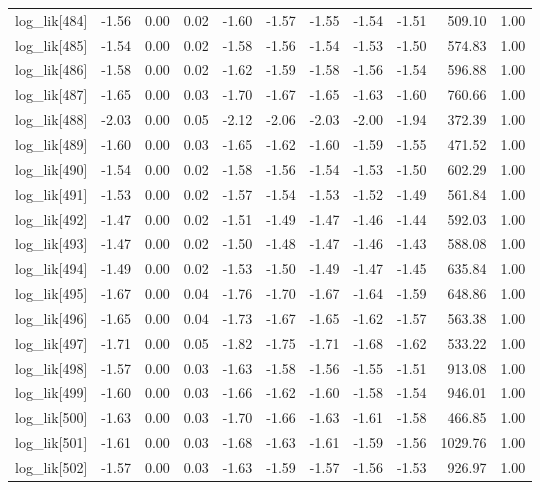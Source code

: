 \begin{table}[ht]
\begin{tabular}{rrrrrrrrrrr}
  log\_lik[484] & -1.56 & 0.00 & 0.02 & -1.60 & -1.57 & -1.55 & -1.54 & -1.51 & 509.10 & 1.00 \\ 
  log\_lik[485] & -1.54 & 0.00 & 0.02 & -1.58 & -1.56 & -1.54 & -1.53 & -1.50 & 574.83 & 1.00 \\ 
  log\_lik[486] & -1.58 & 0.00 & 0.02 & -1.62 & -1.59 & -1.58 & -1.56 & -1.54 & 596.88 & 1.00 \\ 
  log\_lik[487] & -1.65 & 0.00 & 0.03 & -1.70 & -1.67 & -1.65 & -1.63 & -1.60 & 760.66 & 1.00 \\ 
  log\_lik[488] & -2.03 & 0.00 & 0.05 & -2.12 & -2.06 & -2.03 & -2.00 & -1.94 & 372.39 & 1.00 \\ 
  log\_lik[489] & -1.60 & 0.00 & 0.03 & -1.65 & -1.62 & -1.60 & -1.59 & -1.55 & 471.52 & 1.00 \\ 
  log\_lik[490] & -1.54 & 0.00 & 0.02 & -1.58 & -1.56 & -1.54 & -1.53 & -1.50 & 602.29 & 1.00 \\ 
  log\_lik[491] & -1.53 & 0.00 & 0.02 & -1.57 & -1.54 & -1.53 & -1.52 & -1.49 & 561.84 & 1.00 \\ 
  log\_lik[492] & -1.47 & 0.00 & 0.02 & -1.51 & -1.49 & -1.47 & -1.46 & -1.44 & 592.03 & 1.00 \\ 
  log\_lik[493] & -1.47 & 0.00 & 0.02 & -1.50 & -1.48 & -1.47 & -1.46 & -1.43 & 588.08 & 1.00 \\ 
  log\_lik[494] & -1.49 & 0.00 & 0.02 & -1.53 & -1.50 & -1.49 & -1.47 & -1.45 & 635.84 & 1.00 \\ 
  log\_lik[495] & -1.67 & 0.00 & 0.04 & -1.76 & -1.70 & -1.67 & -1.64 & -1.59 & 648.86 & 1.00 \\ 
  log\_lik[496] & -1.65 & 0.00 & 0.04 & -1.73 & -1.67 & -1.65 & -1.62 & -1.57 & 563.38 & 1.00 \\ 
  log\_lik[497] & -1.71 & 0.00 & 0.05 & -1.82 & -1.75 & -1.71 & -1.68 & -1.62 & 533.22 & 1.00 \\ 
  log\_lik[498] & -1.57 & 0.00 & 0.03 & -1.63 & -1.58 & -1.56 & -1.55 & -1.51 & 913.08 & 1.00 \\ 
  log\_lik[499] & -1.60 & 0.00 & 0.03 & -1.66 & -1.62 & -1.60 & -1.58 & -1.54 & 946.01 & 1.00 \\ 
  log\_lik[500] & -1.63 & 0.00 & 0.03 & -1.70 & -1.66 & -1.63 & -1.61 & -1.58 & 466.85 & 1.00 \\ 
  log\_lik[501] & -1.61 & 0.00 & 0.03 & -1.68 & -1.63 & -1.61 & -1.59 & -1.56 & 1029.76 & 1.00 \\ 
  log\_lik[502] & -1.57 & 0.00 & 0.03 & -1.63 & -1.59 & -1.57 & -1.56 & -1.53 & 926.97 & 1.00 \\ 

\end{tabular}
\end{table}
